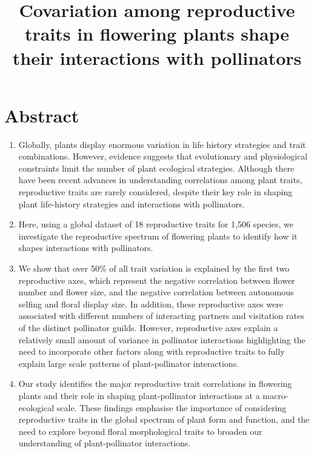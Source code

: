\documentclass[
  12pt,
  a4paper,
]{article}
\title{\singlespacing \vspace{-1.6cm} \LARGE Covariation among reproductive traits in flowering plants shape their interactions with pollinators}
\author{}
\date{\vspace{-2.5em}}
\begin{document}
\maketitle

\doublespacing
\normalsize

\hypertarget{abstract}{%
\section{Abstract}\label{abstract}}

\begin{enumerate}
\def\labelenumi{\arabic{enumi}.}
\item
  Globally, plants display enormous variation in life history strategies and trait combinations. However, evidence suggests that evolutionary and physiological constraints limit the number of plant ecological strategies. Although there have been recent advances in understanding correlations among plant traits, reproductive traits are rarely considered, despite their key role in shaping plant life-history strategies and interactions with pollinators.
\item
  Here, using a global dataset of 18 reproductive traits for 1,506 species, we investigate the reproductive spectrum of flowering plants to identify how it shapes interactions with pollinators.
\item
  We show that over 50\% of all trait variation is explained by the first two reproductive axes, which represent the negative correlation between flower number and flower size, and the negative correlation between autonomous selfing and floral display size. In addition, these reproductive axes were associated with different numbers of interacting partners and visitation rates of the distinct pollinator guilds. However, reproductive axes explain a relatively small amount of variance in pollinator interactions highlighting the need to incorporate other factors along with reproductive traits to fully explain large scale patterns of plant-pollinator interactions.
\item
  Our study identifies the major reproductive trait correlations in flowering plants and their role in shaping plant-pollinator interactions at a macro-ecological scale. These findings emphasise the importance of considering reproductive traits in the global spectrum of plant form and function, and the need to explore beyond floral morphological traits to broaden our understanding of plant-pollinator interactions.
\end{enumerate}
\end{document}
